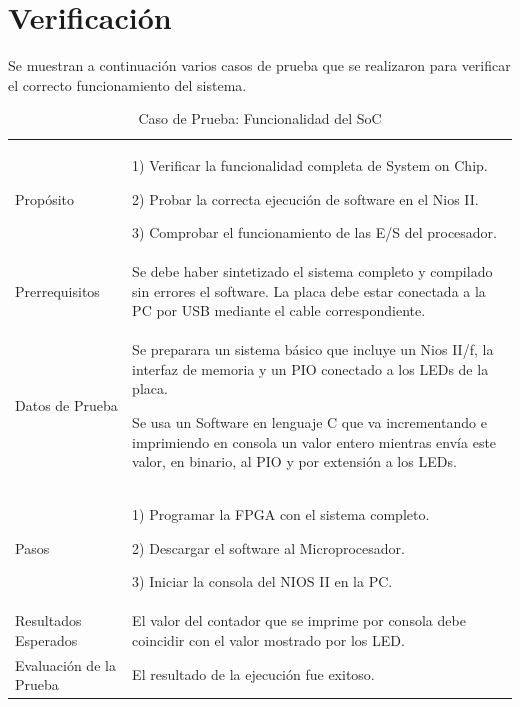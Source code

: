 \section{Verificación}
Se muestran a continuación varios casos de prueba que se realizaron para verificar el correcto funcionamiento del sistema.
\begin{table}
	\begin{tabular}{|>{\columncolor[gray]{0.8}}l|p{11cm}|} \hline
\multicolumn{2}{|>{\columncolor[gray]{0.8}}l|}{\textbf{Caso de Prueba: Funcionalidad del SoC}}\\ \hline
Propósito  & 1) Verificar la funcionalidad completa de System on Chip. 

2) Probar la correcta ejecución de software en el Nios II.

3) Comprobar el funcionamiento de las E/S del procesador. 
\\ \hline
 Prerrequisitos  & Se debe haber sintetizado el sistema completo y compilado sin errores el software. La placa debe estar conectada a la PC por USB mediante el cable correspondiente. \\ \hline
 Datos de Prueba & Se preparara un sistema básico que incluye un Nios II/f, la interfaz de memoria y un PIO conectado a los LEDs de la placa.

Se usa un Software en lenguaje C que va incrementando e imprimiendo en consola un valor entero mientras envía este valor, en binario, al PIO y por extensión a los LEDs.  \\ \hline
 Pasos & 1) Programar la FPGA con el sistema completo.

2) Descargar el software al Microprocesador.

3) Iniciar la consola del NIOS II en la PC.\\ \hline
 Resultados Esperados & El valor del contador que se imprime por consola debe coincidir con el valor mostrado por los LED.\\ \hline
 Evaluación de la Prueba  & El resultado de la ejecución fue exitoso. \\ \hline
	\end{tabular}
	\caption{Caso de Prueba: Funcionalidad del SoC}
	\label{tab:testsoc}
\end{table}
